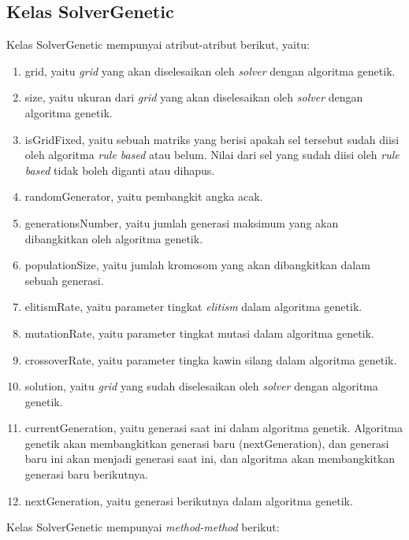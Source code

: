 \subsection{Kelas SolverGenetic}
\label{sec:kelassolvergenetic}

Kelas SolverGenetic mempunyai atribut-atribut berikut, yaitu:

\begin{enumerate}
\item grid, yaitu \textit{grid} yang akan diselesaikan oleh \textit{solver} dengan algoritma genetik.
\item size, yaitu ukuran dari \textit{grid} yang akan diselesaikan oleh \textit{solver} dengan algoritma genetik.
\item isGridFixed, yaitu sebuah matriks yang berisi apakah sel tersebut sudah diisi oleh algoritma \textit{rule based} atau belum. Nilai dari sel yang sudah diisi oleh \textit{rule based} tidak boleh diganti atau dihapus.
\item randomGenerator, yaitu pembangkit angka acak.
\item generationsNumber, yaitu jumlah generasi maksimum yang akan dibangkitkan oleh algoritma genetik.
\item populationSize, yaitu jumlah kromosom yang akan dibangkitkan dalam sebuah generasi.
\item elitismRate, yaitu parameter tingkat \textit{elitism} dalam algoritma genetik.
\item mutationRate, yaitu parameter tingkat mutasi dalam algoritma genetik.
\item crossoverRate, yaitu parameter tingka kawin silang dalam algoritma genetik.
\item solution, yaitu \textit{grid} yang sudah diselesaikan oleh \textit{solver} dengan algoritma genetik.
\item currentGeneration, yaitu generasi saat ini dalam algoritma genetik. Algoritma genetik akan membangkitkan generasi baru (nextGeneration), dan generasi baru ini akan menjadi generasi saat ini, dan algoritma akan membangkitkan generasi baru berikutnya.
\item nextGeneration, yaitu generasi berikutnya dalam algoritma genetik.
\end{enumerate}

Kelas SolverGenetic mempunyai \textit{method-method} berikut:

